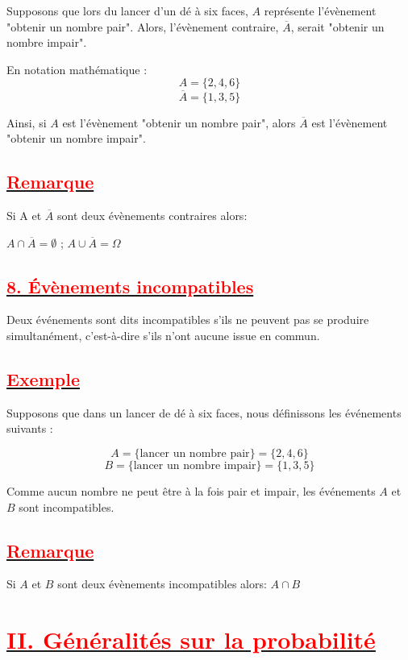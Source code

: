 \documentclass[12pt]{article}
\begin{document}
Supposons que lors du lancer d'un dé à six faces, $A$ représente l'évènement "obtenir un nombre pair". Alors, l'évènement contraire, $\overline{A}$, serait "obtenir un nombre impair".

En notation mathématique :
\[ A = \{2, 4, 6\} \]
\[ \overline{A} = \{1, 3, 5\} \]

Ainsi, si $A$ est l'évènement "obtenir un nombre pair", alors $\overline{A}$ est l'évènement "obtenir un nombre impair".

\subsection*{\underline{\textbf{\textcolor{red}{Remarque}}}}
Si A et $\overline{A}$ sont deux évènements contraires alors:

$A\cap\overline{A}=\emptyset$ ; $A\cup\overline{A}=\Omega$

\subsection*{\underline{\textbf{\textcolor{red}{8. Évènements incompatibles}}}}

Deux événements sont dits incompatibles s'ils ne peuvent pas se produire simultanément, c'est-à-dire s'ils n'ont aucune issue en commun.

\subsection*{\underline{\textbf{\textcolor{red}{Exemple}}}}

Supposons que dans un lancer de dé à six faces, nous définissons les événements suivants :

\[ A = \{\text{lancer un nombre pair}\} = \{2, 4, 6\} \]
\[ B = \{\text{lancer un nombre impair}\} = \{1, 3, 5\} \]

Comme aucun nombre ne peut être à la fois pair et impair, les événements \(A\) et \(B\) sont incompatibles.

\subsection*{\underline{\textbf{\textcolor{red}{Remarque}}}}

Si $A$ et $B$ sont deux évènements incompatibles alors: $A\cap B$ 

\section*{\underline{\textbf{\textcolor{red}{II. Généralités sur la probabilité}}}}
\end{document}
